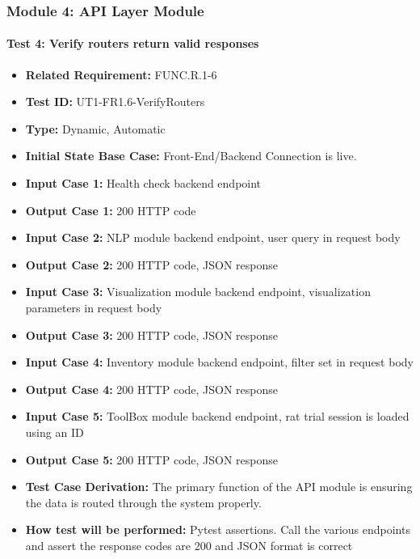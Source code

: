 \documentclass[12pt, titlepage]{article}
\begin{document}
\begin{flushleft}
\subsubsection{Module 4: API Layer Module}

\paragraph{Test 4: Verify routers return valid responses}
\begin{itemize}
    \item \textbf{Related Requirement:} FUNC.R.1-6
    \item \textbf{Test ID:} UT1-FR1.6-VerifyRouters
    \item \textbf{Type:} Dynamic, Automatic
    \item \textbf{Initial State Base Case:} Front-End/Backend Connection is live.
    \item \textbf{Input Case 1:} Health check backend endpoint
    \item \textbf{Output Case 1:} 200 HTTP code
    \item \textbf{Input Case 2:} NLP module backend endpoint, user query in request body
    \item \textbf{Output Case 2:} 200 HTTP code, JSON response
    \item \textbf{Input Case 3:} Visualization module backend endpoint, visualization parameters in request body
    \item \textbf{Output Case 3:} 200 HTTP code, JSON response
    \item \textbf{Input Case 4:} Inventory module backend endpoint, filter set in request body
    \item \textbf{Output Case 4:} 200 HTTP code, JSON response
    \item \textbf{Input Case 5:} ToolBox module backend endpoint, rat trial session is loaded using an ID
    \item \textbf{Output Case 5:} 200 HTTP code, JSON response
    \item \textbf{Test Case Derivation:} The primary function of the API module is ensuring the data is routed through the system properly.
    \item \textbf{How test will be performed:} Pytest assertions. Call the various endpoints and assert the response codes are 200 and JSON format is correct
\end{itemize}


\end{flushleft}
\end{document}
